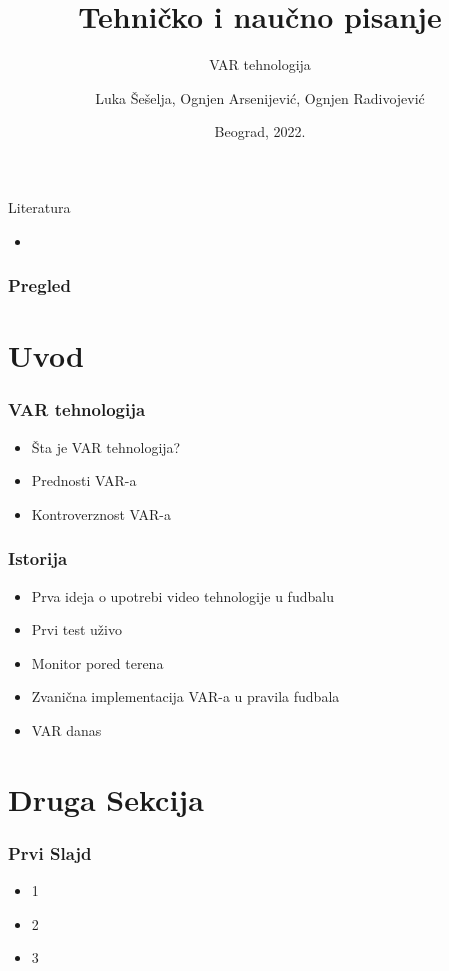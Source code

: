 \documentclass{beamer}
\title{Tehničko i naučno pisanje}
\subtitle{VAR tehnologija}
\author{Luka Šešelja, Ognjen Arsenijević, Ognjen Radivojević}
\institute{Matematički fakultet\\Univerzitet u Beogradu}
\date{\footnotesize{Beograd, 2022.}}
\begin{document}
\begin{frame}
\titlepage
\end{frame}

\begin{frame}[fragile]{Literatura}
    \begin{itemize}
        \item 
    \end{itemize}
\end{frame}

\begin{frame}
  \frametitle{Pregled}
  \tableofcontents
\end{frame}

\section{Uvod}

\begin{frame}
  \frametitle{VAR tehnologija}
  \begin{itemize}
    \item Šta je VAR tehnologija?
    \item Prednosti VAR-a
    \item Kontroverznost VAR-a
  \end{itemize}
\end{frame}

\begin{frame}
  \frametitle{Istorija}
  \begin{itemize}
    \item Prva ideja o upotrebi video tehnologije u fudbalu
    \item Prvi test uživo
    \item Monitor pored terena
    \item Zvanična implementacija VAR-a u pravila fudbala
    \item VAR danas
  \end{itemize}
\end{frame}

\section{Druga Sekcija}

\begin{frame}
  \frametitle{Prvi Slajd}
  \begin{itemize}
    \item  1
    \item  2
    \item  3
  \end{itemize}
\end{frame}
\end{document}
